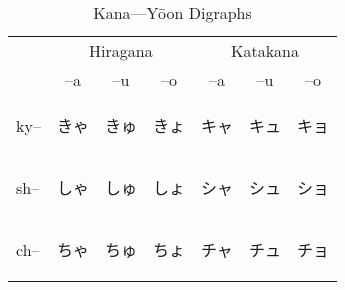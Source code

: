 \begin{table}[H]
	\centering
	\label{t3}
	\caption{Kana---Y\=oon Digraphs }
	\begin{tabular}{l|ccc|ccc}
		\toprule
          & \multicolumn{3}{c|}{Hiragana} & \multicolumn{3}{c}{Katakana} \\
	      & --a & --u & --o & --a & --u & --o \\
		\midrule
        ky--   & {\begin{CJK}{UTF8}{min} きゃ \end{CJK}} & {\begin{CJK}{UTF8}{min} きゅ \end{CJK}} & {\begin{CJK}{UTF8}{min} きょ \end{CJK}} & {\begin{CJK}{UTF8}{min} キャ \end{CJK}} & {\begin{CJK}{UTF8}{min} キュ \end{CJK}} & {\begin{CJK}{UTF8}{min} キョ \end{CJK}} \\
        sh--   & {\begin{CJK}{UTF8}{min} しゃ \end{CJK}} & {\begin{CJK}{UTF8}{min} しゅ \end{CJK}} & {\begin{CJK}{UTF8}{min} しょ \end{CJK}} & {\begin{CJK}{UTF8}{min} シャ \end{CJK}} & {\begin{CJK}{UTF8}{min} シュ \end{CJK}} & {\begin{CJK}{UTF8}{min} ショ \end{CJK}} \\
        ch--   & {\begin{CJK}{UTF8}{min} ちゃ \end{CJK}} & {\begin{CJK}{UTF8}{min} ちゅ \end{CJK}} & {\begin{CJK}{UTF8}{min} ちょ \end{CJK}} & {\begin{CJK}{UTF8}{min} チャ \end{CJK}} & {\begin{CJK}{UTF8}{min} チュ \end{CJK}} & {\begin{CJK}{UTF8}{min} チョ \end{CJK}} \\

\end{tabular}
\end{table}
